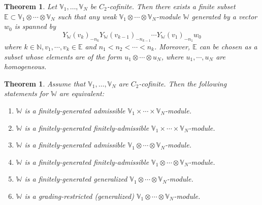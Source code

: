 \documentclass[11pt,b5paper,notitlepage]{article}
\theoremstyle{definition}
\theoremstyle{plain}
\newtheorem{thm}[df]{Theorem}
\newcommand{\wtd}{\widetilde}
\newcommand{\Vbb}{\mathbb V}
\newcommand{\Wbb}{\mathbb W}
\newcommand{\Nbb}{\mathbb N}
\newcommand{\Ebb}{\mathbb E}
\newcommand{\<}{\left\langle}
\renewcommand{\>}{\right\rangle}
\numberwithin{equation}{subsection}
\begin{document}
\begin{thm}\label{Miy}
    Let $\Vbb_1,\dots,\Vbb_N$ be $C_2$-cofinite. Then there exists a finite subset $\Ebb\subset \Vbb_1\otimes\cdots\otimes\Vbb_N$ such that any weak $\Vbb_1\otimes\cdots\otimes\Vbb_N$-module $\Wbb$ generated by a vector $w_0$ is spanned by 
    \begin{equation}\label{finiteness1}
    Y_{\Wbb}(v_k)_{-n_k}Y_\Wbb(v_{k-1})_{-n_{k-1}}\cdots Y_\Wbb(v_1)_{-n_1}w_0
    \end{equation}
    where $k\in \Nbb,v_1,\cdots,v_k\in \Ebb$ and $n_1<n_2<\cdots<n_k$. Moreover, $\Ebb$ can be chosen as a subset whose elements are of the form $u_1\otimes \cdots \otimes u_N$, where $u_1,\cdots,u_N$ are homogeneous. 
\end{thm}




\begin{thm}\label{lb46}
Assume that $\Vbb_1,\dots,\Vbb_N$ are $C_2$-cofinite. Then the following statements for $\Wbb$ are equivalent:
\begin{enumerate}[label=(\alph*)]
\item $\Wbb$ is a finitely-generated admissible $\Vbb_1\times\cdots\times\Vbb_N$-module.
\item $\Wbb$ is a finitely-generated finitely-admissible $\Vbb_1\times\cdots\times\Vbb_N$-module.
\item $\Wbb$ is a finitely-generated admissible $\Vbb_1\otimes\cdots\otimes\Vbb_N$-module.
\item $\Wbb$ is a finitely-generated finitely-admissible $\Vbb_1\otimes\cdots\otimes\Vbb_N$-module.
\item $\Wbb$ is a finitely-generated generalized $\Vbb_1\otimes\cdots\otimes\Vbb_N$-module.
\item $\Wbb$ is a grading-restricted (generalized) $\Vbb_1\otimes\cdots\otimes\Vbb_N$-module.
\end{enumerate}
\end{thm}
\end{document}
